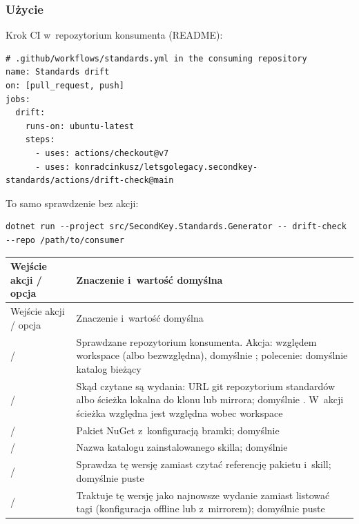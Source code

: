 \subsubsection{Użycie}

Krok CI w~repozytorium konsumenta (README):

\begin{lstlisting}
# .github/workflows/standards.yml in the consuming repository
name: Standards drift
on: [pull_request, push]
jobs:
  drift:
    runs-on: ubuntu-latest
    steps:
      - uses: actions/checkout@v7
      - uses: konradcinkusz/letsgolegacy.secondkey-standards/actions/drift-check@main
\end{lstlisting}

To samo sprawdzenie bez akcji:

\begin{lstlisting}
dotnet run --project src/SecondKey.Standards.Generator -- drift-check --repo /path/to/consumer
\end{lstlisting}

\begin{xltabular}{\linewidth}{@{}>{\raggedright\arraybackslash}p{3.6cm} >{\raggedright\arraybackslash}X@{}}
\toprule
Wejście akcji / opcja & Znaczenie i~wartość domyślna \\
\midrule
\endfirsthead
\toprule
Wejście akcji / opcja & Znaczenie i~wartość domyślna \\
\midrule
\endhead
{} /  & Sprawdzane repozytorium konsumenta. Akcja: względem workspace (albo bezwzględna), domyślnie ; polecenie: domyślnie katalog bieżący \\
 /  & Skąd czytane są wydania: URL git repozytorium standardów albo ścieżka lokalna do klonu lub mirrora; domyślnie . W~akcji ścieżka względna jest względna wobec workspace \\
 /  & Pakiet NuGet z~konfiguracją bramki; domyślnie  \\
 /  & Nazwa katalogu zainstalowanego skilla; domyślnie  \\
 /  & Sprawdza tę wersję zamiast czytać referencję pakietu i~skill; domyślnie puste \\
 /  & Traktuje tę wersję jako najnowsze wydanie zamiast listować tagi (konfiguracja offline lub z~mirrorem); domyślnie puste \\
\bottomrule
\end{xltabular}

